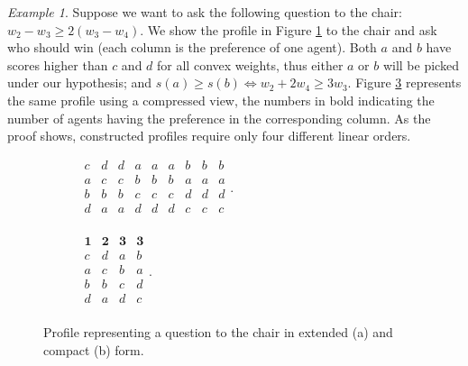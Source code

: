 \documentclass[runningheads]{llncs}
\theoremstyle{remark}
\newtheorem*{example*}{Example}
\begin{document}
\begin{example*}
	Suppose we want to ask the following question to the chair: $w_{2} - w_{3} ≥ 2 (w_{3} - w_{4})$. We show the profile in Figure \ref{fig:profileQstComm} to the chair and ask who should win (each column is the preference of one agent).
	Both $a$ and $b$ have scores higher than $c$ and $d$ for all convex weights, thus either $a$ or $b$ will be picked under our hypothesis; and $s(a) ≥ s(b) ⇔ w_2 + 2 w_4 ≥ 3 w_3$.
	Figure \ref{fig:profileQstCommCompact} represents the same profile using a compressed view, the numbers in bold indicating the number of agents having the preference in the corresponding column. As the proof shows, constructed profiles require only four different linear orders.
	\begin{figure}
		\centering
		\begin{subfigure}[b]{0.49\textwidth}
			\begin{center}
				$
				\begin{array}{ccccccccc}
					c&d&d&a&a&a&b&b&b\\
					a&c&c&b&b&b&a&a&a\\
					b&b&b&c&c&c&d&d&d\\
					d&a&a&d&d&d&c&c&c\\
				\end{array}.
				$
			\end{center}
			\caption{}
			\label{fig:profileQstComm}
		\end{subfigure}
		\hfill
		\begin{subfigure}[b]{0.49\textwidth}
			\begin{center}
				$
				\begin{array}{cccc}
					\mathbf{1}&\mathbf{2}&\mathbf{3}&\mathbf{3} \\
					c&d&a&b\\
					a&c&b&a\\
					b&b&c&d\\
					d&a&d&c\\
				\end{array}.
				$
			\end{center}
			\caption{}
			\label{fig:profileQstCommCompact}
		\end{subfigure}
		\caption{Profile representing a question to the chair in extended (a) and compact (b) form.}
	\end{figure}
\end{example*}
\end{document}
